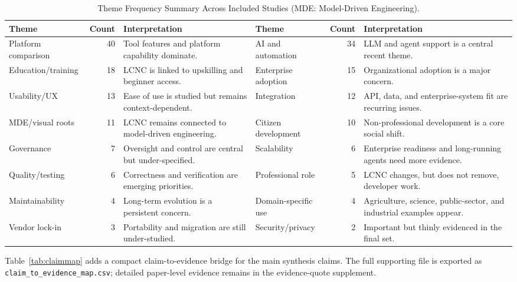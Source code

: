 \documentclass[conference]{IEEEtran}
\begin{document}
\begin{table}[t]
\centering
\caption{Theme Frequency Summary Across Included Studies (MDE: Model-Driven Engineering).}
\label{tab:themes}
\scriptsize
\begin{tabularx}{\textwidth}{l r X l r X}
\toprule
Theme & Count & Interpretation & Theme & Count & Interpretation \\
\midrule
Platform comparison & 40 & Tool features and platform capability dominate. &
AI and automation & 34 & LLM and agent support is a central recent theme. \\
Education/training & 18 & LCNC is linked to upskilling and beginner access. &
Enterprise adoption & 15 & Organizational adoption is a major concern. \\
Usability/UX & 13 & Ease of use is studied but remains context-dependent. &
Integration & 12 & API, data, and enterprise-system fit are recurring issues. \\
MDE/visual roots & 11 & LCNC remains connected to model-driven engineering. &
Citizen development & 10 & Non-professional development is a core social shift. \\
Governance & 7 & Oversight and control are central but under-specified. &
Scalability & 6 & Enterprise readiness and long-running agents need more evidence. \\
Quality/testing & 6 & Correctness and verification are emerging priorities. &
Professional role & 5 & LCNC changes, but does not remove, developer work. \\
Maintainability & 4 & Long-term evolution is a persistent concern. &
Domain-specific use & 4 & Agriculture, science, public-sector, and industrial examples appear. \\
Vendor lock-in & 3 & Portability and migration are still under-studied. &
Security/privacy & 2 & Important but thinly evidenced in the final set. \\
\bottomrule
\end{tabularx}
\end{table}

Table~\ref{tab:claimmap} adds a compact claim-to-evidence bridge for the main synthesis claims. The full supporting file is exported as \texttt{claim\_to\_evidence\_map.csv}; detailed paper-level evidence remains in the evidence-quote supplement.
\end{document}

